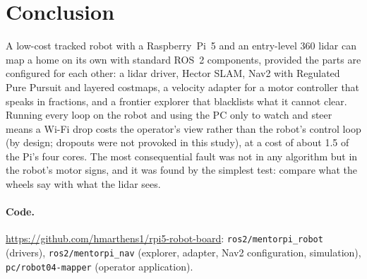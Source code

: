 \documentclass[10pt,twocolumn]{article}
\begin{document}
\section{Conclusion}
A low-cost tracked robot with a Raspberry~Pi~5 and an entry-level 360\textdegree{} lidar can map a home on its own with
standard ROS~2 components, provided the parts are configured for each other: a lidar driver,
Hector SLAM, Nav2 with Regulated Pure Pursuit and layered costmaps, a velocity adapter for a
motor controller that speaks in fractions, and a frontier explorer that blacklists what it cannot
clear. Running every loop on the robot and using the PC only to watch and steer means a Wi-Fi
drop costs the operator's view rather than the robot's control loop (by design; dropouts
were not provoked in this study), at a cost of about 1.5 of the Pi's four cores. The most
consequential fault was not in any algorithm but in the robot's motor signs, and it was found by
the simplest test: compare what the wheels say with what the lidar sees.

\paragraph{Code.} \url{https://github.com/hmarthens1/rpi5-robot-board}: \texttt{ros2/mentorpi\_robot}
(drivers), \texttt{ros2/mentorpi\_nav} (explorer, adapter, Nav2 configuration, simulation),
\texttt{pc/robot04-mapper} (operator application).
\end{document}
